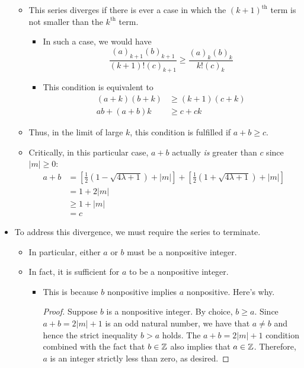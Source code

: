 \documentclass[../finalProject.tex]{subfiles}
\begin{document}
\begin{itemize}
\begin{itemize}
        \item This series diverges if there is ever a case in which the $(k+1)^\text{th}$ term is not smaller than the $k^\text{th}$ term.
        \begin{itemize}
            \item In such a case, we would have
            \begin{equation*}
                \frac{(a)_{k+1}(b)_{k+1}}{(k+1)!(c)_{k+1}} \geq \frac{(a)_k(b)_k}{k!(c)_k}
            \end{equation*}
            \item This condition is equivalent to
            \begin{align*}
                (a+k)(b+k) &\geq (k+1)(c+k)\\
                ab+(a+b)k &\geq c+ck
            \end{align*}
        \end{itemize}
        \item Thus, in the limit of large $k$, this condition is fulfilled if $a+b\geq c$.
        \item Critically, in this particular case, $a+b$ actually \emph{is} greater than $c$ since $|m|\geq 0$:
        \begin{align*}
            a+b &= [\tfrac{1}{2}(1-\sqrt{4\lambda+1})+|m|]+[\tfrac{1}{2}(1+\sqrt{4\lambda+1})+|m|]\\
            &= 1+2|m|\\
            &\geq 1+|m|\\
            &= c
        \end{align*}
    \end{itemize}
    \item To address this divergence, we must require the series to terminate.
    \begin{itemize}
        \item In particular, either $a$ or $b$ must be a nonpositive integer.
        \item In fact, it is sufficient for $a$ to be a nonpositive integer.
        \begin{itemize}
            \item This is because $b$ nonpositive implies $a$ nonpositive. Here's why.
            \begin{proof}
                Suppose $b$ is a nonpositive integer. By choice, $b\geq a$. Since $a+b=2|m|+1$ is an odd natural number, we have that $a\neq b$ and hence the strict inequality $b>a$ holds. The $a+b=2|m|+1$ condition combined with the fact that $b\in\mathbb{Z}$ also implies that $a\in\mathbb{Z}$. Therefore, $a$ is an integer strictly less than zero, as desired.

\end{proof}
\end{itemize}
\end{itemize}
\end{itemize}
\end{document}
